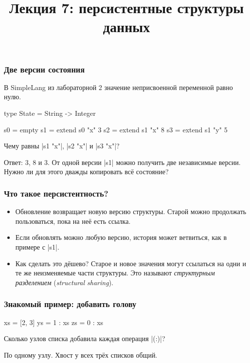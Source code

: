 \documentclass[11pt]{beamer}
\title{Лекция 7: персистентные структуры данных}
\begin{document}
\begin{frame}[plain]
  \maketitle
\end{frame}

\begin{frame}[fragile]
  \frametitle{Две версии состояния}
  В SimpleLang из лабораторной 2 значение неприсвоенной переменной равно нулю.
  \begin{haskell}
    type State = String -> Integer

    s0 = empty
    s1 = extend s0 "x" 3
    s2 = extend s1 "x" 8
    s3 = extend s1 "y" 5
  \end{haskell}
  Чему равны \haskinline|s1 "x"|, \haskinline|s2 "x"| и \haskinline|s3 "x"|? \pause

  Ответ: 3, 8 и 3. От одной версии \haskinline|s1| можно получить две независимые версии. Нужно ли для этого дважды копировать всё состояние?
\end{frame}

\begin{frame}[fragile]
  \frametitle{Что такое персистентность?}
  \begin{itemize}
    \item Обновление возвращает новую версию структуры. Старой можно продолжать пользоваться, пока на неё есть ссылка.
    \item Если обновлять можно любую версию, история может ветвиться, как в примере с \haskinline|s1|.
    \item Как сделать это дёшево? \pause{} Старое и новое значения могут ссылаться на одни и те же неизменяемые части структуры. Это называют \emph{структурным разделением} (\emph{structural sharing}).
  \end{itemize}
\end{frame}

\begin{frame}[fragile]
  \frametitle{Знакомый пример: добавить голову}
  \begin{haskell}
    xs = [2, 3]
    ys = 1 : xs
    zs = 0 : xs
  \end{haskell}
  Сколько узлов списка добавила каждая операция \haskinline|(:)|? \pause

  \begin{center}
  \end{center}
  По одному узлу. Хвост у всех трёх списков общий.
\end{frame}
\end{document}
